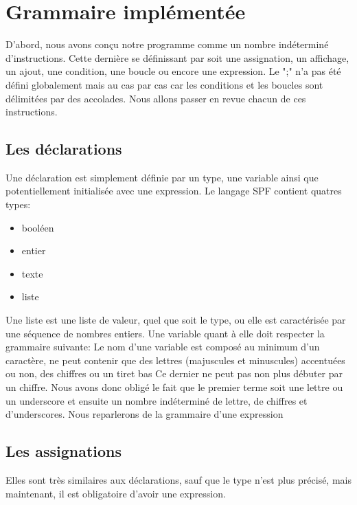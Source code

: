 \section{Grammaire implémentée}
D'abord, nous avons conçu notre programme %
comme un nombre indéterminé d'instructions.
Cette dernière se définissant par soit une assignation, un affichage, un ajout, une condition, une boucle ou encore une expression.
Le ";" n'a pas été défini globalement mais au cas par cas car les conditions et les boucles sont délimitées par des accolades.
Nous allons passer en revue chacun de ces instructions.

\subsection{Les déclarations}
Une déclaration est simplement définie par un type, une variable ainsi que potentiellement initialisée avec une expression.
Le langage SPF contient quatres types:

\begin{itemize}
\item booléen
\item entier
\item texte
\item liste
\end{itemize}

Une liste est une liste de valeur, quel que soit le type, ou elle est caractérisée par une séquence de nombres entiers.
Une variable quant à elle doit respecter la grammaire suivante:
Le nom d’une variable est composé au minimum d’un caractère, ne peut contenir que des lettres (majuscules et minuscules) accentuées ou non, des chiffres ou un tiret bas %
Ce dernier ne peut pas non plus débuter par un chiffre.
Nous avons donc obligé le fait que le premier terme soit une lettre ou un underscore et ensuite un nombre indéterminé de lettre, de chiffres et d'underscores. %
Nous reparlerons de la grammaire d'une expression %

\subsection{Les assignations}
Elles sont très similaires aux déclarations, sauf que le type n'est plus précisé, mais maintenant, il est obligatoire d'avoir une expression.

